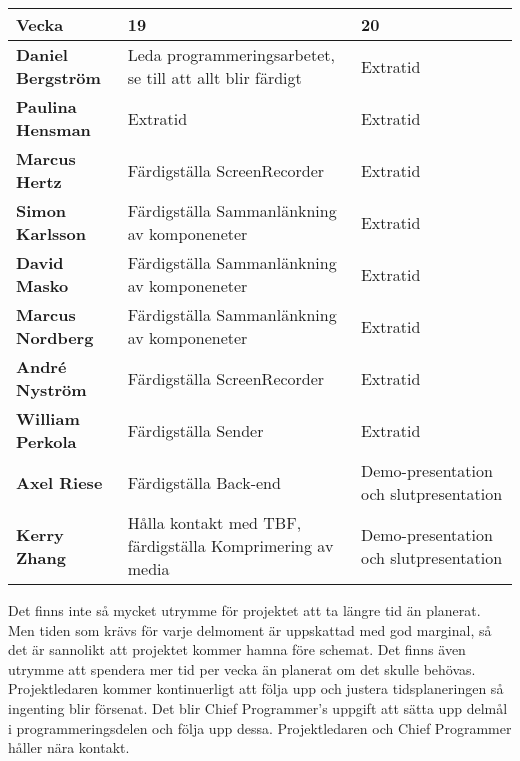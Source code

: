 \begin{tabular}{ | p{100pt} || p{110pt} | p{233pt} |}
  \hline
  \textbf{Vecka} & 19 & 20\\ \hline
  \textbf{Daniel Bergström} & Leda programmeringsarbetet, se till att allt blir färdigt & Extratid \\ \hline
  \textbf{Paulina Hensman} & Extratid & Extratid \\ \hline
  \textbf{Marcus Hertz} & Färdigställa ScreenRecorder & Extratid \\ \hline
  \textbf{Simon Karlsson} & Färdigställa Sammanlänkning av komponeneter & Extratid\\ \hline
  \textbf{David Masko} & Färdigställa Sammanlänkning av komponeneter & Extratid \\ \hline
  \textbf{Marcus Nordberg} & Färdigställa Sammanlänkning av komponeneter & Extratid \\ \hline
  \textbf{André Nyström} & Färdigställa ScreenRecorder & Extratid \\ \hline
  \textbf{William Perkola} & Färdigställa Sender & Extratid\\ \hline
  \textbf{Axel Riese} & Färdigställa Back-end & Demo-presentation och slutpresentation \\ \hline
  \textbf{Kerry Zhang} & Hålla kontakt med TBF, färdigställa Komprimering av media & Demo-presentation och slutpresentation \\ \hline
\end{tabular}

Det finns inte så mycket utrymme för projektet att ta längre tid än planerat. Men tiden som krävs för varje delmoment är uppskattad med god marginal, så det är sannolikt att projektet kommer hamna före schemat. Det finns även utrymme att spendera mer tid per vecka än planerat om det skulle behövas. Projektledaren kommer kontinuerligt att följa upp och justera tidsplaneringen så ingenting blir försenat. Det blir Chief Programmer’s uppgift att sätta upp delmål i programmeringsdelen och följa upp dessa. Projektledaren och Chief Programmer håller nära kontakt.
